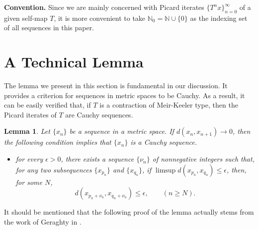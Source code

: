 \documentclass[a4paper,10pt,twoside,reqno]{amsart}
\newtheorem{lem}[thm]{Lemma}
\theoremstyle{definition}
\theoremstyle{remark}
\newcommand{\set}[1]{\{#1\}}
\newcommand{\e}{\epsilon}
\newcommand{\N}{\mathbb{N}}
\numberwithin{equation}{section}
\begin{document}
\medskip \noindent
\textbf{Convention.}
Since we are mainly concerned with Picard iterates $\set{T^nx}_{n=0}^\infty$ of a given self-map $T$,
it is more convenient to take $\N_0=\N\cup\set{0}$ as the indexing set of all sequences
in this paper.

\bigskip

\section{A Technical Lemma}
\label{sec:technical-lemma}

The lemma we present in this section is fundamental in our discussion.
It provides a criterion for sequences in metric spaces to be Cauchy.
As a result, it can be easily verified that, if $T$ is a contraction
of Meir-Keeler type, then the Picard iterates of $T$
are Cauchy sequences.

\begin{lem}
\label{lem:technical-lemma}
  Let $\set{x_n}$ be a sequence in a metric space. If $d(x_n,x_{n+1})\to0$,
  then the following condition implies that $\{x_n\}$ is a Cauchy sequence.
  \begin{itemize}
    \item for every $\e>0$, there exists a sequence $\set{\nu_n}$
    of nonnegative integers such that, for any two subsequences
    $\{x_{p_n}\}$ and $\{x_{q_n}\}$, if\/ $\limsup d(x_{p_n},x_{q_n})\leq \e$,
    then, for some $N$,
    \begin{equation}\label{eqn:d(xpn+nun,xqn+nun)<=e}
      d(x_{p_n+\nu_n},x_{q_n+\nu_n}) \leq \e, \qquad (n\geq N).
    \end{equation}
  \end{itemize}
\end{lem}

It should be mentioned that the following proof of the lemma actually stems from the work of
Geraghty in \cite{Geraghty-73}.
\end{document}
